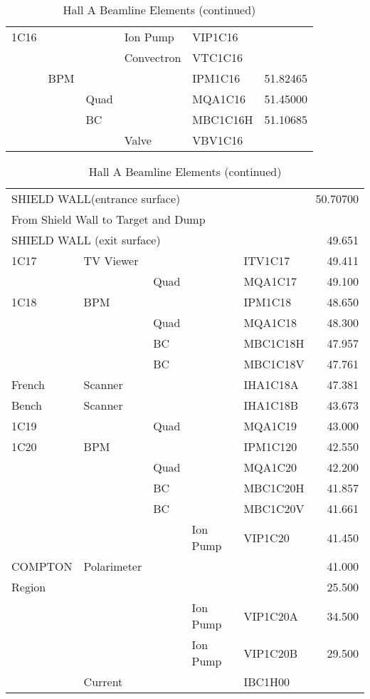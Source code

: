 \begin{table}[hp]
\caption[Beamline: Hall A Beamline Elements]{Hall A Beamline Elements (continued)}
\label{beam_tab1b2}
\begin{tabular}{lllllr}
 
1C16 &&& Ion Pump & VIP1C16 & \\
&&& Convectron & VTC1C16 & \\
& BPM &&& IPM1C16 & 51.82465 \\
&& Quad && MQA1C16 & 51.45000 \\
&& BC && MBC1C16H & 51.10685 \\
&&& Valve & VBV1C16 & \\ \hline
\end{tabular}

\begin{tabular}{lllllr} \hline
\multicolumn{4}{l}{SHIELD WALL(entrance surface)} && 50.70700 \\
\multicolumn{4}{l}{From Shield Wall to Target and Dump} & \\ \hline
\multicolumn{4}{l}{SHIELD WALL (exit surface)} && 49.651 \\
1C17 & TV Viewer &&& ITV1C17 & 49.411 \\
&& Quad && MQA1C17 & 49.100 \\
1C18 & BPM &&& IPM1C18 & 48.650 \\
&& Quad && MQA1C18 & 48.300 \\
&& BC && MBC1C18H & 47.957 \\
&& BC && MBC1C18V & 47.761 \\ \hline
\noindent 
French & Scanner &&& IHA1C18A & 47.381 \\
Bench & Scanner &&& IHA1C18B & 43.673 \\ \hline
1C19 && Quad && MQA1C19 & 43.000 \\
1C20 & BPM &&& IPM1C120 & 42.550 \\
&& Quad && MQA1C20 & 42.200 \\
&& BC && MBC1C20H & 41.857 \\
&& BC && MBC1C20V & 41.661 \\
&&& Ion Pump & VIP1C20 & 41.450 \\ \hline
\noindent  
COMPTON & Polarimeter &&&& 41.000 \\
Region &&&&& 25.500 \\
&&& Ion Pump & VIP1C20A & 34.500 \\
&&& Ion Pump & VIP1C20B & 29.500 \\ \hline
& Current &&& IBC1H00 & \\

\end{tabular}
\end{table}
